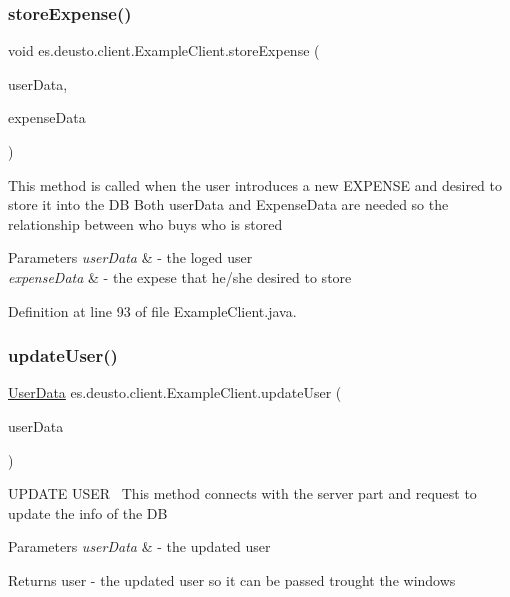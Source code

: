 \subsubsection{\texorpdfstring{store\+Expense()}{storeExpense()}}
{\footnotesize\ttfamily void es.\+deusto.\+client.\+Example\+Client.\+store\+Expense (\begin{DoxyParamCaption}\item[{\hyperlink{classes_1_1deusto_1_1serialization_1_1_user_data}{User\+Data}}]{user\+Data,  }\item[{\hyperlink{classes_1_1deusto_1_1serialization_1_1_expense_data}{Expense\+Data}}]{expense\+Data }\end{DoxyParamCaption})}

This method is called when the user introduces a new E\+X\+P\+E\+N\+SE and desired to store it into the DB Both user\+Data and Expense\+Data are needed so the relationship between who buys who is stored 
\begin{DoxyParams}{Parameters}
{\em user\+Data} & -\/ the loged user \\
\hline
{\em expense\+Data} & -\/ the expese that he/she desired to store \\
\hline
\end{DoxyParams}


Definition at line 93 of file Example\+Client.\+java.

\mbox{\label{classes_1_1deusto_1_1client_1_1_example_client_afbee30635a2cfe7fb7cfc58393b40bfb}} 
\subsubsection{\texorpdfstring{update\+User()}{updateUser()}}
{\footnotesize\ttfamily \hyperlink{classes_1_1deusto_1_1serialization_1_1_user_data}{User\+Data} es.\+deusto.\+client.\+Example\+Client.\+update\+User (\begin{DoxyParamCaption}\item[{\hyperlink{classes_1_1deusto_1_1serialization_1_1_user_data}{User\+Data}}]{user\+Data }\end{DoxyParamCaption})}

U\+P\+D\+A\+TE U\+S\+ER~\newline
This method connects with the server part and request to update the info of the DB 
\begin{DoxyParams}{Parameters}
{\em user\+Data} & -\/ the updated user \\
\hline
\end{DoxyParams}
\begin{DoxyReturn}{Returns}
user -\/ the updated user so it can be passed trought the windows 
\end{DoxyReturn}


